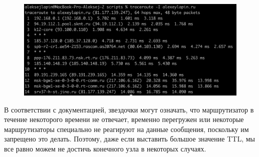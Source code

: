 \documentclass[12pt,onecolumn]{article}
\begin{document}
\begin{figure}[H]
    \centering
    \includegraphics*[width=\textwidth]{image/part2/traceroute.png}
\end{figure}
В соответствии с документацией, звездочки могут означать, что маршрутизатор в течение некоторого времени не отвечает, временно перегружен или некоторые маршрутизаторы специально не реагируют на данные сообщения, поскольку им запрещено это делать. Поэтому, даже если выставить большое значение TTL, мы все равно можем не достичь конечного узла в некоторых случаях.
\end{document}
